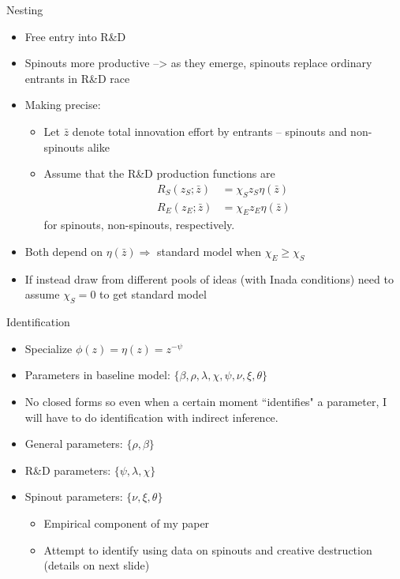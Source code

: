 \documentclass[english,usenames,dvipsnames]{beamer}
\begin{document}
\begin{frame}{Nesting}
\begin{itemize}
	\item Free entry into R\&D
	\item Spinouts more productive --> as they emerge, spinouts replace ordinary entrants in R\&D race
	\item Making precise:
	\begin{itemize}
		\item Let $\bar{z}$ denote total innovation effort by entrants -- spinouts and non-spinouts alike
		\item Assume that the R\&D production functions are
		\begin{align*}
		R_S (z_S; \bar{z}) &= \chi_S z_S \eta(\bar{z}) \\ 
		R_E (z_E; \bar{z}) &= \chi_E z_E \eta(\bar{z}) 
		\end{align*}
		for spinouts, non-spinouts, respectively.
	\end{itemize}  
	\item Both depend on $\eta(\bar{z}) \Rightarrow$ standard model when $\chi_E \ge \chi_S$
	\item If instead draw from different pools of ideas (with Inada conditions) need to assume $\chi_S = 0$ to get standard model
\end{itemize}
\end{frame}

\begin{frame}{Identification}
\begin{itemize}
	\item Specialize $\phi(z) = \eta(z) = z^{-\psi}$ 
	\item Parameters in baseline model: $\{\beta,\rho,\lambda,\chi,\psi,\nu,\xi,\theta\}$
	\item No closed forms so even when a certain moment ``identifies" a parameter, I will have to do identification with indirect inference. 
	\item General parameters: $\{\rho,\beta\}$
	\item R\&D parameters: $\{\psi,\lambda, \chi\}$
	\item Spinout parameters: $\{ \nu,\xi,\theta \}$
	\begin{itemize}
		\item Empirical component of my paper
		\item Attempt to identify using data on spinouts and creative destruction (details on next slide)
	\end{itemize}
\end{itemize}
\end{frame}
\end{document}
